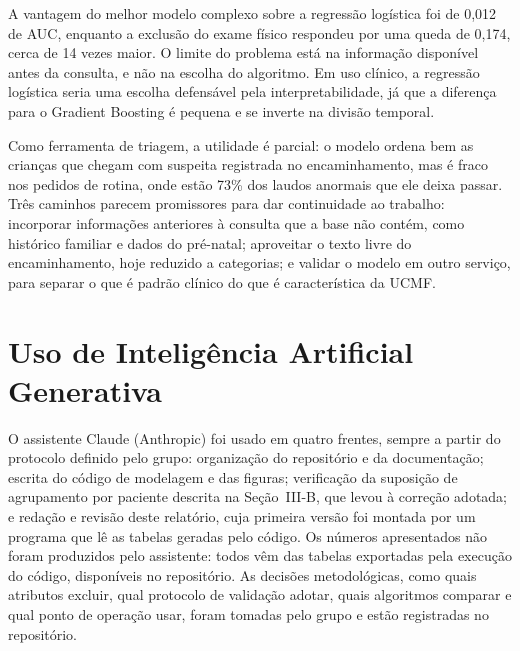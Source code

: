 \documentclass[conference]{IEEEtran}
\begin{document}
A vantagem do melhor modelo complexo sobre a regressão logística foi de 0,012 de AUC, enquanto a exclusão do exame físico respondeu por uma queda de 0,174, cerca de 14 vezes maior. O limite do problema está na informação disponível antes da consulta, e não na escolha do algoritmo. Em uso clínico, a regressão logística seria uma escolha defensável pela interpretabilidade, já que a diferença para o Gradient Boosting é pequena e se inverte na divisão temporal.

Como ferramenta de triagem, a utilidade é parcial: o modelo ordena bem as crianças que chegam com suspeita registrada no encaminhamento, mas é fraco nos pedidos de rotina, onde estão 73\% dos laudos anormais que ele deixa passar. Três caminhos parecem promissores para dar continuidade ao trabalho: incorporar informações anteriores à consulta que a base não contém, como histórico familiar e dados do pré-natal; aproveitar o texto livre do encaminhamento, hoje reduzido a categorias; e validar o modelo em outro serviço, para separar o que é padrão clínico do que é característica da UCMF.

\section{Uso de Inteligência Artificial Generativa}
O assistente Claude (Anthropic) foi usado em quatro frentes, sempre a partir do protocolo definido pelo grupo: organização do repositório e da documentação; escrita do código de modelagem e das figuras; verificação da suposição de agrupamento por paciente descrita na Seção~III-B, que levou à correção adotada; e redação e revisão deste relatório, cuja primeira versão foi montada por um programa que lê as tabelas geradas pelo código. Os números apresentados não foram produzidos pelo assistente: todos vêm das tabelas exportadas pela execução do código, disponíveis no repositório. As decisões metodológicas, como quais atributos excluir, qual protocolo de validação adotar, quais algoritmos comparar e qual ponto de operação usar, foram tomadas pelo grupo e estão registradas no repositório.
\end{document}
